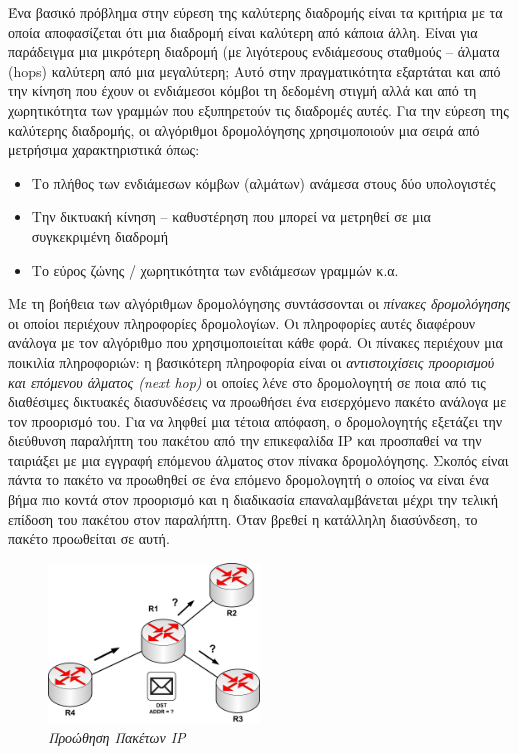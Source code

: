 Ένα βασικό πρόβλημα στην εύρεση της καλύτερης διαδρομής είναι τα κριτήρια με τα οποία αποφασίζεται ότι μια διαδρομή είναι καλύτερη από κάποια άλλη.  Είναι για παράδειγμα μια μικρότερη διαδρομή (με λιγότερους ενδιάμεσους σταθμούς -- άλματα (hops) καλύτερη από μια μεγαλύτερη; Αυτό στην πραγματικότητα εξαρτάται και από την κίνηση που έχουν οι ενδιάμεσοι κόμβοι τη δεδομένη στιγμή αλλά και από τη χωρητικότητα των γραμμών που εξυπηρετούν τις διαδρομές αυτές. Για την εύρεση της καλύτερης διαδρομής, οι αλγόριθμοι δρομολόγησης χρησιμοποιούν μια σειρά από μετρήσιμα χαρακτηριστικά όπως:

\begin{itemize}
\item Το πλήθος των ενδιάμεσων κόμβων (αλμάτων) ανάμεσα στους δύο υπολογιστές
\item Την δικτυακή κίνηση -- καθυστέρηση που μπορεί να μετρηθεί σε μια συγκεκριμένη διαδρομή
\item Το εύρος ζώνης / χωρητικότητα των ενδιάμεσων γραμμών κ.α.
\end{itemize}

Με τη βοήθεια των αλγόριθμων δρομολόγησης συντάσσονται οι \emph{πίνακες δρομολόγησης} οι οποίοι περιέχουν πληροφορίες δρομολογίων. Οι πληροφορίες αυτές διαφέρουν ανάλογα με τον αλγόριθμο που χρησιμοποιείται κάθε φορά.  Οι πίνακες περιέχουν μια ποικιλία πληροφοριών: η βασικότερη πληροφορία είναι οι \emph{αντιστοιχίσεις προορισμού και επόμενου άλματος (next hop)} οι οποίες λένε στο δρομολογητή σε ποια από τις διαθέσιμες δικτυακές διασυνδέσεις να προωθήσει ένα εισερχόμενο πακέτο ανάλογα με τον προορισμό του. Για να ληφθεί μια τέτοια απόφαση, ο δρομολογητής εξετάζει την διεύθυνση παραλήπτη του πακέτου από την επικεφαλίδα IP και προσπαθεί να την ταιριάξει με μια εγγραφή επόμενου άλματος στον πίνακα δρομολόγησης. Σκοπός είναι πάντα το πακέτο να προωθηθεί σε ένα επόμενο δρομολογητή ο οποίος να είναι ένα βήμα πιο κοντά στον προορισμό και η διαδικασία επαναλαμβάνεται μέχρι την τελική επίδοση του πακέτου στον παραλήπτη. Όταν βρεθεί η κατάλληλη διασύνδεση, το πακέτο προωθείται σε αυτή.

\begin{figure}[!ht]
 \centering
 \includegraphics[width=0.50\textwidth]{images/chapter3/3-19}
 \caption {\textsl{Προώθηση Πακέτων IP}}
 \label{3-19}
\end{figure}

